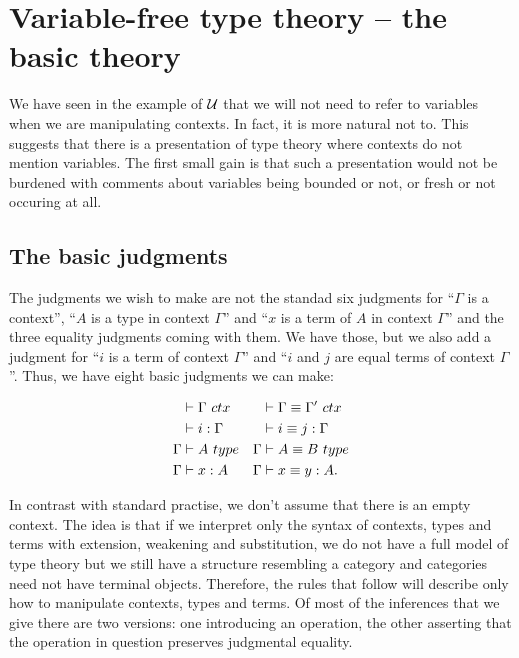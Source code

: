\section{Variable-free type theory -- the basic theory}
We have seen in the example of $\mathcal{U}$ that we will not need to refer to variables
when we are manipulating contexts. In fact, it is more natural not to.
This suggests that there is a presentation
of type theory where contexts do not mention variables. The first small gain is that such a presentation
would not be burdened with comments about variables being bounded or not, or fresh or
not occuring at all.

\subsection{The basic judgments}
The judgments we wish to make are not the standad six judgments for ``$\Gamma$ is a context'', ``$A$ is
a type in context $\Gamma$'' and ``$x$ is a term of $A$ in context $\Gamma$'' and the three equality
judgments coming with them. We have those, but we also add a judgment for ``$i$ is a term of context $\Gamma$''
and ``$i$ and $j$ are equal terms of context $\Gamma$''. Thus, we have eight basic judgments we can make:

\begin{align*}
\jctx*{\Gamma} & \jctxeq*{\Gamma}{\Gamma'}\\
\jtermc*{\Gamma}{i} & \jtermceq*{\Gamma}{i}{j}\\
\jtype*{\Gamma}{A} & \jtypeeq*{\Gamma}{A}{B}\\
\jterm*{\Gamma}{A}{x} & \jtermeq*{\Gamma}{A}{x}{y}.
\end{align*}

In contrast with standard practise, we don't assume that there is an empty context. The idea is that
if we interpret only the syntax of contexts, types and terms with extension, weakening and
substitution, we do not have a full model of type theory but we still have a 
structure resembling a category and categories need not have terminal objects. Therefore,
the rules that follow will describe only how to manipulate contexts, types and terms.
Of most of the inferences that we give there are two versions: one introducing an operation, the other asserting that the operation in question preserves judgmental equality. 

